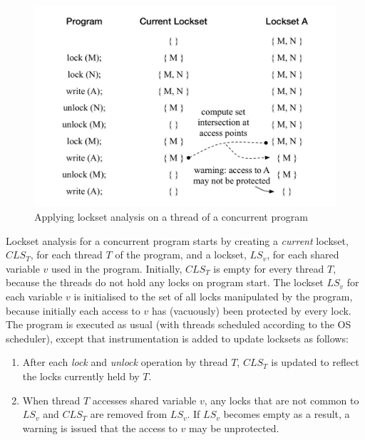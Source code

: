 \begin{figure}[htbp]
\centering
\includegraphics[width=1\linewidth]{img/lockset.pdf}
\caption{Applying lockset analysis on a thread of a concurrent program}
\label{fig:locksets}
\end{figure}

  

Lockset analysis for a concurrent program starts by creating a \emph{current} lockset, $CLS_T$, for each thread $T$ of the program, and a lockset, $LS_v$, for each shared variable $v$ used in the program.
Initially, $CLS_T$ is empty for every thread $T$, because the threads do not hold any locks on program start.
The lockset $LS_v$ for each variable $v$ is initialised to the set of all locks manipulated by the program,
because initially each access to $v$ has (vacuously) been protected by every lock.
The program is executed as usual (with threads scheduled according to the OS scheduler), except that
instrumentation is added to update locksets as follows:
%
\begin{enumerate}
\item After each \emph{lock} and \emph{unlock} operation by thread $T$, $CLS_T$ is updated to reflect the locks currently held by $T$.
\item When thread $T$ accesses shared variable $v$, any locks that are not common to $LS_v$ and $CLS_T$ are removed from $LS_v$.
If $LS_v$ becomes empty as a result, a warning is issued that the access to $v$ may be unprotected.
\end{enumerate}

